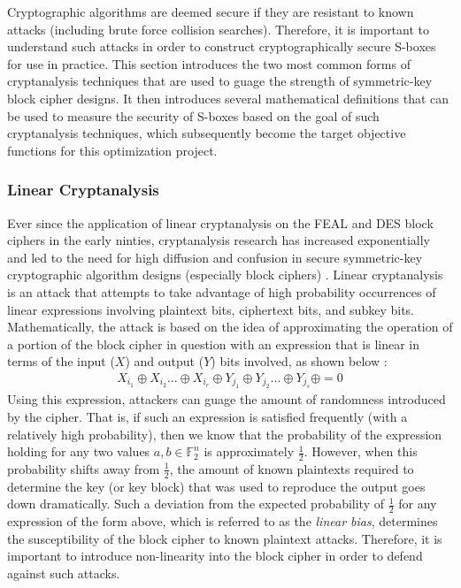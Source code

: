\documentclass[11pt]{article}
\newcommand{\field}[1]{\mathbb{#1}} %
\begin{document}
Cryptographic algorithms are deemed secure if they are resistant to known attacks (including brute force collision searches). Therefore, it is important to understand such attacks in order to construct cryptographically secure S-boxes for use in practice. This section introduces the two most common forms of cryptanalysis techniques that are used to guage the strength of symmetric-key block cipher designs. It then introduces several mathematical definitions that can be used to measure the security of S-boxes based on the goal of such cryptanalysis techniques, which subsequently become the target objective functions for this optimization project.

\subsubsection{Linear Cryptanalysis}
Ever since the application of linear cryptanalysis on the FEAL and DES block ciphers in the early ninties, cryptanalysis research has increased exponentially and led to the need for high diffusion and confusion in secure symmetric-key cryptographic algorithm designs (especially block ciphers) \cite{Heys01atutorial}. Linear cryptanalysis is an attack that attempts to take advantage of high probability occurrences of linear expressions involving plaintext bits, ciphertext bits, and subkey bits. Mathematically, the attack is based on the idea of approximating the operation of a portion of the block cipher in question with an expression that is linear in terms of the input ($X$) and output ($Y$) bits involved, as shown below \cite{Heys01atutorial}:
\begin{eqnarray*}
X_{i_{1}} \oplus X_{i_{2}} ... \oplus X_{i_{r}} \oplus Y_{j_{1}} \oplus Y_{j_{2}} ... \oplus Y_{j_{s}} \oplus  = 0
\end{eqnarray*}
Using this expression, attackers can guage the amount of randomness introduced by the cipher. That is, if such an expression is satisfied frequently (with a relatively high probability), then we know that the probability of the expression holding for any two values $a,b\in \field{F}_2^n$ is approximately $\frac{1}{2}$. However, when this probability shifts away from $\frac{1}{2}$, the amount of known plaintexts required to determine the key (or key block) that was used to reproduce the output goes down dramatically. Such a deviation from the expected probability of $\frac{1}{2}$ for any expression of the form above, which is referred to as the \emph{linear bias}, determines the susceptibility of the block cipher to known plaintext attacks. Therefore, it is important to introduce non-linearity into the block cipher in order to defend against such attacks.
\end{document}
